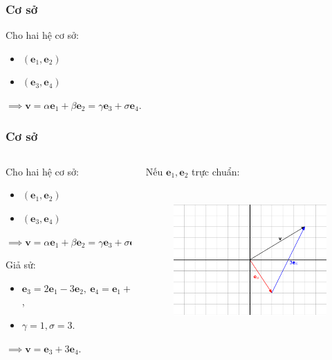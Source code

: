 \begin{frame}
    \frametitle{Cơ sở}
    Cho hai hệ cơ sở:
               \begin{itemize}
                  \item \((\mathbf{e}_1 ,\mathbf{e}_2)\) 
                \item \((\mathbf{e}_3 ,\mathbf{e}_4)\) 
                \end{itemize}
                \(\implies \mathbf{v}=\alpha\mathbf{e}_1 +\beta\mathbf{e}_2 =\gamma\mathbf{e}_3 +\sigma\mathbf{e}_{4}.\)
\end{frame}
\begin{frame}
    \frametitle{Cơ sở}
    \begin{columns}
        \begin{column}{0.45\textwidth}
            Cho hai hệ cơ sở:
               \begin{itemize}
                  \item \((\mathbf{e}_1 ,\mathbf{e}_2)\) 
                \item \((\mathbf{e}_3 ,\mathbf{e}_4)\) 
                \end{itemize}
                \(\implies \mathbf{v}=\alpha\mathbf{e}_1 +\beta\mathbf{e}_2 =\gamma\mathbf{e}_3 +\sigma\mathbf{e}_{4}.\)

                Giả sử: 
                \begin{itemize}
                \item \(\mathbf{e}_3 =2\mathbf{e}_1 -3\mathbf{e}_2 ,~\mathbf{e}_4 =\mathbf{e}_1 +2\mathbf{e}_2\),
                \item \(\gamma=1, \sigma =3\).
                \end{itemize}
                \(\implies \mathbf{v}=\mathbf{e}_3 +3\mathbf{e}_4\).
        \end{column}
        \begin{column}{0.55\textwidth}
            Nếu \(\mathbf{e}_1 ,\mathbf{e}_2\) trực chuẩn:
            \begin{figure}[htps]
                \centering
                \includegraphics[width=7cm, height=5.5cm]{Slides/Figure/e3e4.png}
            \end{figure}
        \end{column}
    \end{columns}
\end{frame}
